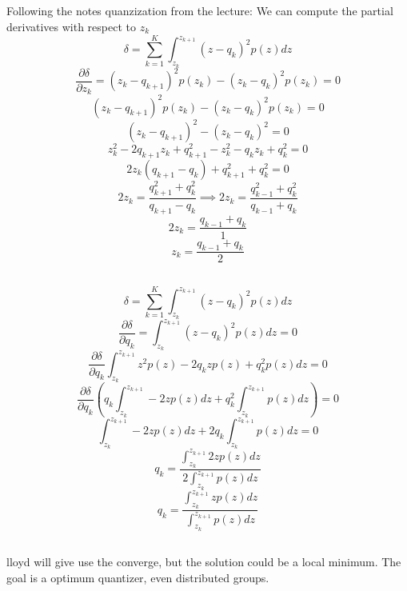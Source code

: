 \documentclass[12pt]{article}
\begin{document}
\subsection{}
Following the notes quanzization from the lecture: We can compute the partial derivatives with respect to $z_{k}$
\[ \delta = \sum_{k=1}^{K} \int_{z_{k}}^{z_{k+1}} (z-q_{k})^2p(z) dz  \]
\[ \frac{\partial \delta}{\partial z_{k}} = (z_{k} - q_{k+1})^2 p(z_{k}) - (z_{k} - q_{k})^2 p(z_{k}) = 0\]
\[ (z_{k} - q_{k+1})^2 p(z_{k}) - (z_{k} - q_{k})^2 p(z_{k}) = 0\]
\[ (z_{k} - q_{k+1})^2 - (z_{k} - q_{k})^2 = 0\]
\[ z_{k}^2 - 2 q_{k+1} z_{k} + q_{k+1}^2 - z_{k}^2 - q_{k}z_{k} + q_{k}^2 = 0\]
\[ 2 z_{k} ( q_{k+1} - q_{k} ) + q_{k+1}^2 + q_{k}^2 = 0\]
\[ 2 z_{k} = \frac{q_{k+1}^2 + q_{k}^2}{q_{k+1} - q_{k}} \implies 2 z_{k} = \frac{q_{k-1}^2 + q_{k}^2}{q_{k-1} + q_{k}} \]
\[ 2 z_{k} = \frac{q_{k-1} + q_{k}}{1} \]
\[ z_{k} = \frac{q_{k-1} + q_{k}}{2} \]
\subsection{}
\[ \delta = \sum_{k=1}^{K} \int_{z_{k}}^{z_{k+1}} (z-q_{k})^2p(z) dz  \]
\[ \frac{\partial \delta}{\partial q_{k}} = \int_{z_{k}}^{z_{k+1}} (z-q_{k})^2p(z) dz = 0\]
\[ \frac{\partial \delta}{\partial q_{k}} \int_{z_{k}}^{z_{k+1}} z^2 p(z) - 2q_{k}z p(z)  + q_{k}^2 p(z) dz = 0\]
\[ \frac{\partial \delta}{\partial q_{k}} (q_{k} \int_{z_{k}}^{z_{k+1}} - 2z p(z) dz + q_{k}^2 \int_{z_{k}}^{z_{k+1}} p(z) dz) = 0\]
\[ \int_{z_{k}}^{z_{k+1}} - 2z p(z) dz + 2q_{k} \int_{z_{k}}^{z_{k+1}} p(z) dz = 0\]
\[ q_{k} = \frac{\int_{z_{k}}^{z_{k+1}} 2z p(z) dz} {2 \int_{z_{k}}^{z_{k+1}} p(z) dz}\]
\[ q_{k} = \frac{\int_{z_{k}}^{z_{k+1}} z p(z) dz}{\int_{z_{k}}^{z_{k+1}} p(z) dz}\]

\subsection{}
lloyd  will give use the converge, but the solution could be a local minimum. The goal is a optimum quantizer, even distributed groups.
\end{document}
